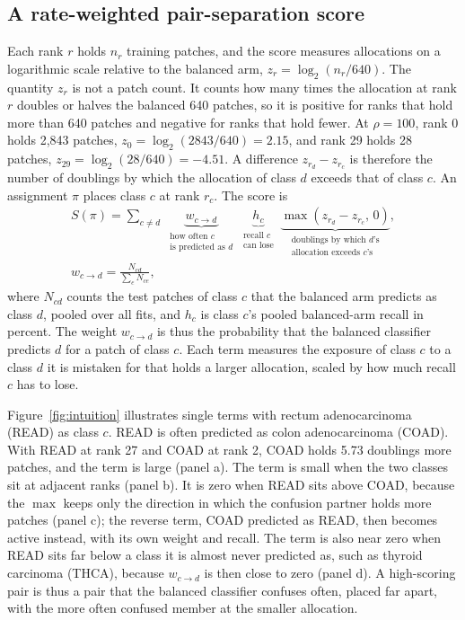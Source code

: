 \documentclass[11pt]{article}
\begin{document}
\subsection{A rate-weighted pair-separation score}
\label{sec:score}
Each rank $r$ holds $n_r$ training patches, and the score measures allocations on a logarithmic scale relative to the balanced arm, $z_r = \log_2(n_r/640)$. The quantity $z_r$ is not a patch count. It counts how many times the allocation at rank $r$ doubles or halves the balanced 640 patches, so it is positive for ranks that hold more than 640 patches and negative for ranks that hold fewer. At $\rho=100$, rank 0 holds 2,843 patches, $z_0 = \log_2(2843/640) = 2.15$, and rank 29 holds 28 patches, $z_{29} = \log_2(28/640) = -4.51$. A difference $z_{r_d} - z_{r_c}$ is therefore the number of doublings by which the allocation of class $d$ exceeds that of class $c$. An assignment $\pi$ places class $c$ at rank $r_c$. The score is
\begin{equation}
  \begin{gathered}
  S(\pi) = \sum_{c \neq d}\;
  \underbrace{w_{c \rightarrow d}}_{\substack{\text{how often } c\\ \text{is predicted as } d}}\;
  \underbrace{h_c}_{\substack{\text{recall } c\\ \text{can lose}}}\;
  \underbrace{\max\!\left(z_{r_d} - z_{r_c},\, 0\right)}_{\substack{\text{doublings by which } d\text{'s}\\ \text{allocation exceeds } c\text{'s}}},
  \\[4pt]
  w_{c \rightarrow d} = \frac{N_{cd}}{\sum_{e} N_{ce}},
  \end{gathered}
  \label{eq:score}
\end{equation}
\noindent where $N_{cd}$ counts the test patches of class $c$ that the balanced arm predicts as class $d$, pooled over all fits, and $h_c$ is class $c$'s pooled balanced-arm recall in percent. The weight $w_{c \rightarrow d}$ is thus the probability that the balanced classifier predicts $d$ for a patch of class $c$. Each term measures the exposure of class $c$ to a class $d$ it is mistaken for that holds a larger allocation, scaled by how much recall $c$ has to lose.

Figure~\ref{fig:intuition} illustrates single terms with rectum adenocarcinoma (READ) as class $c$. READ is often predicted as colon adenocarcinoma (COAD). With READ at rank 27 and COAD at rank 2, COAD holds 5.73 doublings more patches, and the term is large (panel a). The term is small when the two classes sit at adjacent ranks (panel b). It is zero when READ sits above COAD, because the $\max$ keeps only the direction in which the confusion partner holds more patches (panel c); the reverse term, COAD predicted as READ, then becomes active instead, with its own weight and recall. The term is also near zero when READ sits far below a class it is almost never predicted as, such as thyroid carcinoma (THCA), because $w_{c \rightarrow d}$ is then close to zero (panel d). A high-scoring pair is thus a pair that the balanced classifier confuses often, placed far apart, with the more often confused member at the smaller allocation.
\end{document}
